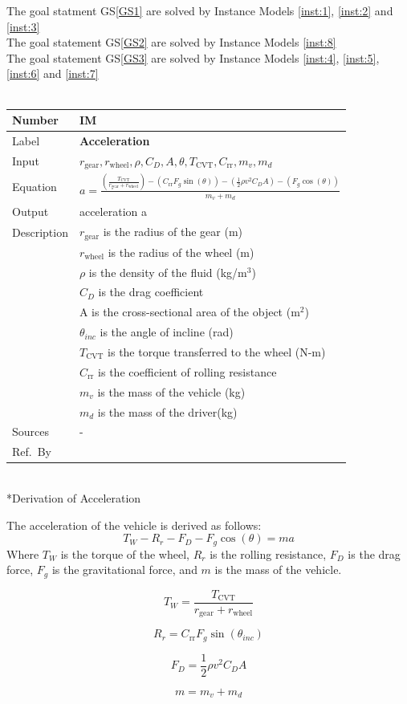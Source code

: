 \documentclass[12pt]{article}
\newcommand{\colAwidth}{0.13\textwidth}
\newcommand{\colBwidth}{0.82\textwidth}
\newcounter{instnum} %
\newcommand{\definstance}[7] {
~\newline
\noindent
\begin{minipage}{\textwidth}
\renewcommand*{\arraystretch}{1.5}
\begin{tabular}{| p{\colAwidth} | p{\colBwidth}|}
  \hline
  \rowcolor[gray]{0.9}
  Number& IM\refstepcounter{instnum}\theinstnum \label{inst:\theinstnum}\\
  \hline
  Label& \bf #1 \\
  \hline
  Input& #2\\
  \hline
  Equation& #3\\
  \hline
  Output& #4\\
  \hline
  Description& #5 \\
  \hline
  Sources& #6 \\
  \hline
  Ref.\ By & #7\\
  \hline
\end{tabular}
\end{minipage}\\
}
\begin{document}
{\noindent}The goal statment GS\ref{GS1} are solved by Instance Models \ref{inst:1}, \ref{inst:2} and \ref{inst:3}\\
{\noindent}The goal statement GS\ref{GS2} are solved by Instance Models \ref{inst:8}\\
The goal statement GS\ref{GS3} are solved by Instance Models \ref{inst:4}, \ref{inst:5}, \ref{inst:6} and \ref{inst:7}\\
  \definstance
  {Acceleration}
  {$r_{\text{gear}}, r_{\text{wheel}}, \rho, C_D, A, \theta, T_{\text{CVT}}, C_{\text{rr}}, m_v, m_d$}
  {$a = \frac{\left( \frac{T_{\text{CVT}}}{r_{\text{gear}} + r_{\text{wheel}}} \right) - (C_{\text{rr}} F_g \sin(\theta)) - \left( \frac{1}{2} \rho v^2 C_D A \right) - (F_g \cos(\theta))}{m_v + m_d}$}
  {acceleration a}
  {$r_{\text{gear}}$ is the radius of the gear (m)\\
  & $r_{\text{wheel}}$ is the radius of the wheel (m)\\
  & $\rho$ is the density of the fluid (kg/m$^3$)\\
  & $C_D$ is the drag coefficient\\
  & A is the cross-sectional area of the object (m$^2$)\\
  & $\theta_{inc}$ is the angle of incline (rad)\\
  & $T_{\text{CVT}}$ is the torque transferred to the wheel (N-m)\\
  & $C_{\text{rr}}$ is the coefficient of rolling resistance\\
  & $m_v$ is the mass of the vehicle (kg)\\
  & $m_d$ is the mass of the driver(kg)}
  {-}
  
  
  \subsubsection*{Derivation of Acceleration}

The acceleration of the vehicle is derived as follows: 
\[
T_W - R_r - F_D - F_g \cos(\theta) = ma
\]
Where \( T_W \) is the torque of the wheel, \( R_r \) is the rolling resistance, \( F_D \) is the drag force, \( F_g \) is the gravitational force, and \( m \) is the mass of the vehicle. 

\[
T_W = \frac{T_{\text{CVT}}}{r_{\text{gear}} + r_{\text{wheel}}}
\]

\[
R_r = C_{\text{rr}} F_g \sin(\theta_{inc})
\]

\[
F_D = \frac{1}{2} \rho v^2 C_D A
\]

\[
m = m_v + m_d
\]
\end{document}
